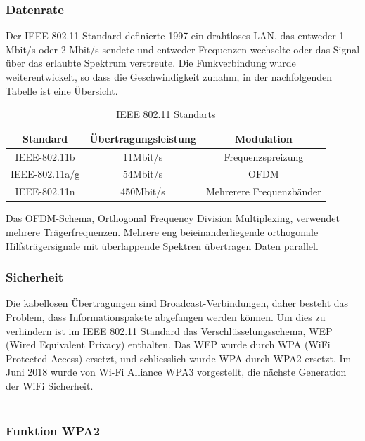 \subsubsection{Datenrate}
Der IEEE 802.11 Standard definierte 1997 ein drahtloses LAN, das entweder 1 Mbit/s oder 2 Mbit/s sendete und entweder Frequenzen wechselte oder das Signal über das erlaubte Spektrum verstreute. Die Funkverbindung wurde weiterentwickelt, so dass die Geschwindigkeit zunahm, in der nachfolgenden Tabelle ist eine Übersicht.
\begin{table}[H]
	\centering
	\begin{tabular}{|c|c|c|}
		\hline 
		Standard & Übertragungsleistung & Modulation \\ 
		\hline 
		IEEE-802.11b & 11Mbit/s & Frequenzspreizung \\ 
		\hline 
		IEEE-802.11a/g & 54Mbit/s & OFDM \\ 
		\hline 
		IEEE-802.11n & 450Mbit/s & Mehrerere Frequenzbänder \\ 
		\hline 
	\end{tabular} 
\caption{IEEE 802.11 Standarts \cite{wetherall_computernetzwerke_2012}}
\label{tab: IEEE802.11Standartds}
\end{table}
Das OFDM-Schema, Orthogonal Frequency Division Multiplexing, verwendet mehrere Trägerfrequenzen. Mehrere eng beieinanderliegende orthogonale Hilfsträgersignale mit überlappende Spektren übertragen Daten parallel.

\subsubsection{Sicherheit}

Die kabellosen Übertragungen sind Broadcast-Verbindungen, daher besteht das Problem, dass Informationspakete abgefangen werden können. Um dies zu verhindern ist im IEEE  802.11 Standard das Verschlüsselungsschema, WEP (Wired Equivalent Privacy) enthalten. Das WEP wurde durch WPA (WiFi Protected Access) ersetzt, und schliesslich wurde WPA durch WPA2 ersetzt. Im Juni 2018 wurde von Wi-Fi Alliance WPA3 vorgestellt, die nächste Generation der WiFi Sicherheit.\\
\\
\subsubsection{Funktion WPA2}

